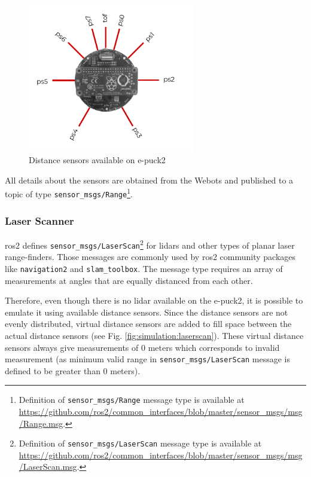 \begin{figure}[H]
    \centering
    \includegraphics[width=0.65\textwidth]{simulation/figures/distance_sensors.pdf}
    \caption{Distance sensors available on e-puck2}
    \label{fig:simulation:distance_sensors}
\end{figure}

All details about the sensors are obtained from the Webots and published to a topic of type \texttt{sensor\_msgs/Range}\footnote{Definition of \texttt{sensor\_msgs/Range} message type is available at \url{https://github.com/ros2/common_interfaces/blob/master/sensor_msgs/msg/Range.msg}.}.

\subsubsection{Laser Scanner}
\ac{ros2} defines \texttt{sensor\_msgs/LaserScan}\footnote{Definition of \texttt{sensor\_msgs/LaserScan} message type is available at \url{https://github.com/ros2/common_interfaces/blob/master/sensor_msgs/msg/LaserScan.msg}.} for \acp{lidar} and other types of planar laser range-finders.
Those messages are commonly used by \ac{ros2} community packages like \texttt{navigation2} and \texttt{slam\_toolbox}.
The message type requires an array of measurements at angles that are equally distanced from each other. 

Therefore, even though there is no \ac{lidar} available on the e-puck2, it is possible to emulate it using available distance sensors.
Since the distance sensors are not evenly distributed, virtual distance sensors are added to fill space between the actual distance sensors (see Fig. \ref{fig:simulation:laserscan}).
These virtual distance sensors always give measurements of 0 meters which corresponds to invalid measurement (as minimum valid range in \texttt{sensor\_msgs/LaserScan} message is defined to be greater than 0 meters).

